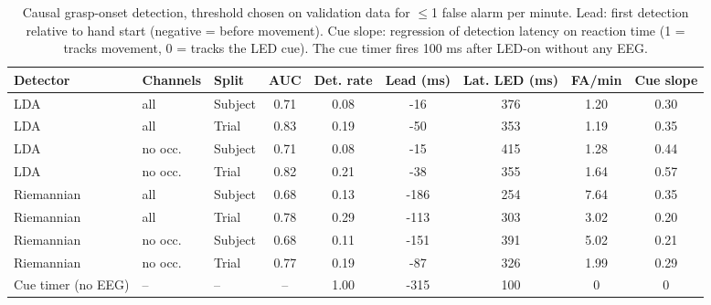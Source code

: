 \begin{table}[t]
\centering
\caption{Causal grasp-onset detection, threshold chosen on validation data for $\leq$1 false alarm per minute. Lead: first detection relative to hand start (negative = before movement). Cue slope: regression of detection latency on reaction time (1 = tracks movement, 0 = tracks the LED cue). The cue timer fires 100 ms after LED-on without any EEG.}
\label{tab:onset}
\footnotesize
\setlength{\tabcolsep}{3pt}
\begin{tabular}{lllcccccc}
\toprule
Detector & Channels & Split & AUC & Det. rate & Lead (ms) & Lat. LED (ms) & FA/min & Cue slope \\
\midrule
LDA & all & Subject & 0.71 & 0.08 & -16 & 376 & 1.20 & 0.30 \\
LDA & all & Trial & 0.83 & 0.19 & -50 & 353 & 1.19 & 0.35 \\
LDA & no occ. & Subject & 0.71 & 0.08 & -15 & 415 & 1.28 & 0.44 \\
LDA & no occ. & Trial & 0.82 & 0.21 & -38 & 355 & 1.64 & 0.57 \\
Riemannian & all & Subject & 0.68 & 0.13 & -186 & 254 & 7.64 & 0.35 \\
Riemannian & all & Trial & 0.78 & 0.29 & -113 & 303 & 3.02 & 0.20 \\
Riemannian & no occ. & Subject & 0.68 & 0.11 & -151 & 391 & 5.02 & 0.21 \\
Riemannian & no occ. & Trial & 0.77 & 0.19 & -87 & 326 & 1.99 & 0.29 \\
\midrule
Cue timer (no EEG) & -- & -- & -- & 1.00 & -315 & 100 & 0 & 0 \\
\bottomrule
\end{tabular}
\end{table}
